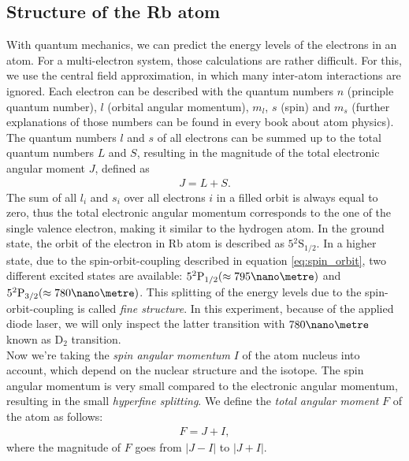 \subsection{Structure of the Rb atom}
With quantum mechanics, we can predict the energy levels of the electrons in an atom. For a multi-electron system, those calculations are rather difficult. For this, we use the central field approximation, in which many inter-atom interactions are ignored. Each electron can be described with the quantum numbers $n$ (principle quantum number), $l$ (orbital angular momentum), $m_l$, $s$ (spin) and $m_s$ (further explanations of those numbers can be found in every book about atom physics). The quantum numbers $l$ and $s$ of all electrons can be summed up to the total quantum numbers $L$ and $S$, resulting in the magnitude of the total electronic angular moment $J$, defined as
\begin{align}
J=L+S.
\label{eq:spin_orbit}
\end{align}
The sum of all $l_i$ and $s_i$ over all electrons $i$ in a filled orbit is always equal to zero, thus the total electronic angular momentum corresponds to the one of the single valence electron, making it similar to the hydrogen atom. In the ground state, the orbit of the electron in Rb atom is described as $5{}^2\mathrm{S}_{1/2}$. In a higher state, due to the spin-orbit-coupling described in equation \eqref{eq:spin_orbit}, two different excited states are available: $5{}^2\mathrm{P}_{1/2} (\approx 795 \nano\metre)$ and $5{}^2\mathrm{P}_{3/2} (\approx 780\nano\metre)$. This splitting of the energy levels due to the spin-orbit-coupling is called \emph{fine structure}. In this experiment, because of the applied diode laser, we will only inspect the latter transition with $780\nano\metre$ known as D$_2$ transition.\\
Now we're taking the \emph{spin angular momentum} $I$ of the atom nucleus into account, which depend on the nuclear structure and the isotope. The spin angular momentum is very small compared to the electronic angular momentum, resulting in the small \emph{hyperfine splitting}. We define the \emph{total angular moment} $F$ of the atom as follows:
\begin{align}
F=J+I,
\end{align}
where the magnitude of $F$ goes from $|J-I|$ to $|J+I| $.


